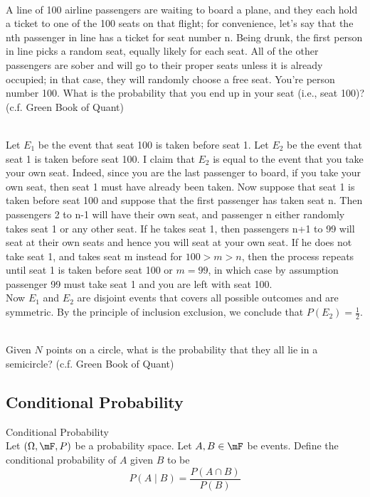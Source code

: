 \documentclass[a4paper]{article}
\begin{document}
\begin{eg}{}{}\\
A line of 100 airline passengers are waiting to board a plane, and they each hold a ticket to one of the 100 seats on that flight; for convenience, let's say that the nth passenger in line has a ticket for seat number n. Being drunk, the first person in line picks a random seat, equally likely for each seat. All of the other passengers are sober and will go to their proper seats unless it is already occupied; in that case, they will randomly choose a free seat. You're person number 100. What is the probability that you end up in your seat (i.e., seat 100)? (c.f. Green Book of Quant)
\begin{answer}\\
Let $E_1$ be the event that seat 100 is taken before seat 1. Let $E_2$ be the event that seat 1 is taken before seat 100. I claim that $E_2$ is equal to the event that you take your own seat. Indeed, since you are the last passenger to board, if you take your own seat, then seat 1 must have already been taken. Now suppose that seat 1 is taken before seat 100 and suppose that the first passenger has taken seat n. Then passengers 2 to n-1 will have their own seat, and passenger n either randomly takes seat 1 or any other seat. If he takes seat 1, then passengers n+1 to 99 will seat at their own seats and hence you will seat at your own seat. If he does not take seat 1, and takes seat m instead for $100>m>n$, then the process repeats until seat 1 is taken before seat 100 or $m=99$, in which case by assumption passenger 99 must take seat 1 and you are left with seat 100. \\

Now $E_1$ and $E_2$ are disjoint events that covers all possible outcomes and are symmetric. By the principle of inclusion exclusion, we conclude that $P(E_2)=\frac{1}{2}$. 
\end{answer}
\end{eg}

\begin{eg}{}{}\\
Given $N$ points on a circle, what is the probability that they all lie in a semicircle? (c.f. Green Book of Quant)
\end{eg}

\subsection{Conditional Probability}
\begin{defn}{Conditional Probability}{}\\
Let $(\Omega,\mF,P)$ be a probability space. Let $A,B\in\mF$ be events. Define the conditional probability of $A$ given $B$ to be $$P(A\;|\;B)=\frac{P(A\cap B)}{P(B)}$$
\end{defn}
\end{document}
